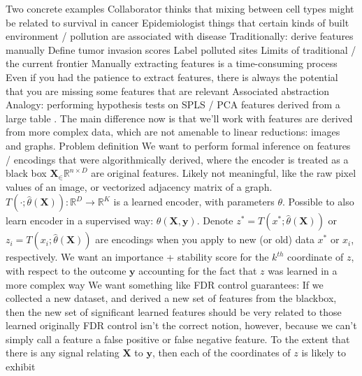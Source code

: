 \documentclass[11pt]{article}
\begin{document}
\begin{outline}
\1 Two concrete examples
  \2 Collaborator thinks that mixing between cell types might be related to
  survival in cancer
  \2 Epidemiologist things that certain kinds of built environment / pollution
  are associated with disease
  \2 Traditionally: derive features manually
    \3 Define tumor invasion scores
    \3 Label polluted sites
  \2 Limits of traditional / the current frontier
    \3 Manually extracting features is a time-consuming process
    \3 Even if you had the patience to extract features, there is always the
    potential that you are missing some features that are relevant
\1 Associated abstraction
  \2 Analogy: performing hypothesis tests on SPLS / PCA features derived from a
  large table \citep{rao1955estimation, elguero1988confidence}.
    \3 The main difference now is that we'll work with features are derived from
    more complex data, which are not amenable to linear reductions: images and
    graphs.
  \2 Problem definition
    \3 We want to perform formal inference on features / encodings that were
    algorithmically derived, where the encoder is treated as a black box
      \4 $\mathbf{X}_ \in \mathbb{R}^{n \times D}$ are original features. Likely
      not meaningful, like the raw pixel values of an image, or vectorized
      adjacency matrix of a graph.
      \4 $T\left(\cdot; \hat{\theta}\left(\mathbf{X}\right)\right) :
      \mathbb{R}^{D} \to \mathbb{R}^{K}$ is a learned encoder, with parameters
      $\theta$. Possible to also learn encoder in a supervised way:
      $\theta\left(\mathbf{X}, \mathbf{y}\right)$.
      \4 Denote $z^{\ast} = T\left(x^{\ast};
      \hat{\theta}\left(\mathbf{X}\right)\right)$ or $z_{i} = T\left(x_{i};
      \hat{\theta}\left(\mathbf{X}\right)\right)$ are encodings when you apply
      to new (or old) data $x^\ast$ or $x_{i}$, respectively.
      \4 We want an importance + stability score for the $k^{th}$ coordinate of
      $z$, with respect to the outcome $\mathbf{y}$ accounting for the fact that
      $z$ was learned in a more complex way
    \3 We want something like FDR control guarantees: If we collected a new
    dataset, and derived a new set of features from the blackbox, then the new
    set of significant learned features should be very related to those learned
    originally
      \4 FDR control isn't the correct notion, however, because we can't simply
      call a feature a false positive or false negative feature.
      \4 To the extent that there is any signal relating $\mathbf{X}$ to
      $\mathbf{y}$, then each of the coordinates of $z$ is likely to exhibit

\end{outline}
\end{document}
